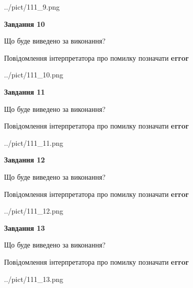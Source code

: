 \documentclass[11pt, ukrainian]{article}
\begin{document}
{\begin {large}
\begin{center}
	{../pict/111_9.png}
\end{center}
\newpage

{\begin {center}\textbf{Завдання 10}\end {center}}\par
Що буде виведено за виконання? \par
Повідомлення інтерпретатора про помилку позначати \textbf{error}

\begin{center}
	{../pict/111_10.png}
\end{center}
\newpage

{\begin {center}\textbf{Завдання 11}\end {center}}\par
Що буде виведено за виконання? \par
Повідомлення інтерпретатора про помилку позначати \textbf{error}

\begin{center}
	{../pict/111_11.png}
\end{center}
\newpage

{\begin {center}\textbf{Завдання 12}\end {center}}\par
Що буде виведено за виконання? \par
Повідомлення інтерпретатора про помилку позначати \textbf{error}

\begin{center}
	{../pict/111_12.png}
\end{center}
\newpage

{\begin {center}\textbf{Завдання 13}\end {center}}\par
Що буде виведено за виконання? \par
Повідомлення інтерпретатора про помилку позначати \textbf{error}

\begin{center}
	{../pict/111_13.png}
\end{center}
\newpage


\end{large}}
\end{document}
